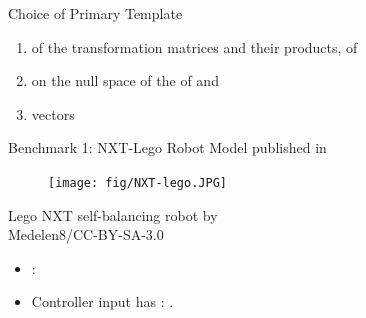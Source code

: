 \begin{frame}{Choice of Primary Template}
\begin{block}{}
\begin{enumerate}
\item {} of the transformation matrices and their products,  of 
\item  {}  on the null space of
   the  of  and   
\item  {} vectors
\end{enumerate}
\end{block}

\end{frame}



\begin{frame}{Benchmark 1: NXT-Lego Robot Model}
 published in  %

\begin{minipage}{0.3\textwidth}
\begin{figure}
\centering
\texttt{[image: fig/NXT-lego.JPG]}
\end{figure}
\end{minipage}
\begin{minipage}{0.6\textwidth}
{\footnotesize Lego NXT self-balancing robot by\\ Medelen8/CC-BY-SA-3.0}
\begin{itemize}
\item {}:
\item Controller input has : .
\end{itemize}
\end{minipage}

\end{frame}


